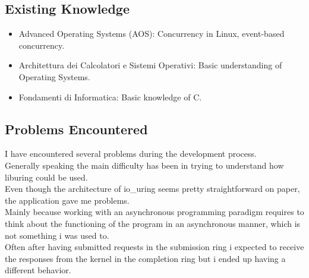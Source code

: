 \documentclass[10pt, oneside,english]{article}   	%
\begin{document}
\subsection{Existing Knowledge}

\begin{itemize}
    \item Advanced Operating Systems (AOS): Concurrency in Linux, event-based concurrency.
    \item Architettura dei Calcolatori e Sistemi Operativi: Basic understanding of Operating Systems.
    \item Fondamenti di Informatica: Basic knowledge of C.
\end{itemize}

\subsection{Problems Encountered}
I have encountered several problems during the development process. \\
Generally speaking the main difficulty has been in trying to understand how liburing could be used. \\
Even though the architecture of io\_uring seems pretty straightforward on paper, the application gave me problems.\\ 
Mainly because working with an asynchronous programming paradigm requires to think about the functioning of the program in an asynchronous manner, which is not something i was used to. \\
Often after having submitted requests in the submission ring i expected to receive the responses from the kernel in the completion ring but i ended up having a different behavior.
\end{document}
